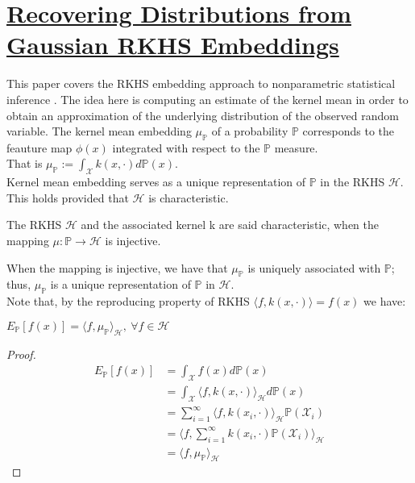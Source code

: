 \section{\href{http://proceedings.mlr.press/v33/kanagawa14.pdf}{Recovering Distributions from Gaussian RKHS Embeddings}}
This paper covers the RKHS embedding approach to nonparametric statistical inference \cite{pmlr}.
The idea here is computing an estimate of the kernel mean in order to obtain an approximation of the underlying distribution of the observed random variable.
The kernel mean embedding $\mu_{\mathbb{P}}$ of a probability $\mathbb{P}$ corresponds to the feauture map $\phi(x)$ integrated with respect to the $\mathbb{P}$ measure.
\\
That is $\mu_{\mathbb{P}}:=\int_{\mathcal{X}}k(x,\cdot)d\mathbb{P}(x)$.
\\
Kernel mean embedding serves as a unique representation of $\mathbb{P}$ in the RKHS $\mathcal{H}$. This holds provided  that $\mathcal{H}$ is characteristic. 
\begin{definition}
The RKHS $\mathcal{H}$ and the associated kernel k are said characteristic, when the mapping $\mu : \mathbb{P} \rightarrow \mathcal{H}$ is injective.
\end{definition}
When the mapping is injective, we have that $\mu_{\mathbb{P}}$ is uniquely associated with $\mathbb{P}$; thus, $\mu_{\mathbb{P}}$ is a unique representation of $\mathbb{P}$ in $\mathcal{H}$. 
\\
Note that, by the reproducing property of RKHS $\langle f, k(x,\cdot) \rangle=f(x)$ we have:
\\
\begin{center}
    $E_{\mathbb{P}}[f(x)]=\langle f,\mu_{\mathbb{P}} \rangle_{\mathcal{H}}, \ \forall f \in \mathcal{H}$
\end{center}

\begin{proof}   
\begin{align*}
E_{\mathbb{P}}[f(x)]&=\int_{\mathcal{X}} f(x) d\mathbb{P}(x)\\
&=\int_{\mathcal{X}} \langle f, k(x,\cdot) \rangle_{\mathcal{H}} d\mathbb{P}(x)\\
&= \sum_{i=1}^{\infty} \langle f, k(x_{i}, \cdot) \rangle_{\mathcal{H}} \mathbb{P}(\mathcal{X}_{i}) \\
&=\langle f, \sum_{i=1}^{\infty} k(x_{i}, \cdot)\mathbb{P}(\mathcal{X}_{i}) \rangle_{\mathcal{H}}\\
&=\langle f, \mu_{\mathbb{P}} \rangle_{\mathcal{H}}
\end{align*}
\end{proof}


